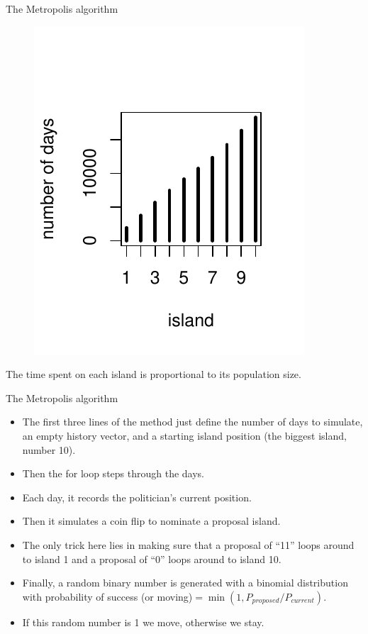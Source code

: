 \documentclass[handout]{beamer}
\begin{document}
\begin{frame}{The Metropolis algorithm}

   \begin{figure}[h!]
	\centering
	\includegraphics[scale=0.92]{pics/mcmc_islands.pdf}
	\end{figure} 

\scriptsize{
	The time spent on each island is proportional to its population size.}
	
\end{frame}



\begin{frame}{The Metropolis algorithm}
\scriptsize{

\begin{itemize}
\item The first three lines of the method just define
the number of days to simulate, an empty history vector, and a starting island position (the biggest island, number 10).
\item Then the for loop steps through the days. 
\item Each day, it records the politician's current position.
\item Then it simulates a coin flip to nominate a proposal island. 
\item The only trick here lies in making sure that a proposal of ``11'' loops around to island 1 and a proposal of “0” loops around to island 10.
\item Finally, a random binary number is generated with a binomial distribution with probability of success (or moving)$=\min(1,P_{proposed}/P_{current})$.
\item If this random number is 1 we move, otherwise we stay.

\end{itemize}


} 
\end{frame}
\end{document}

